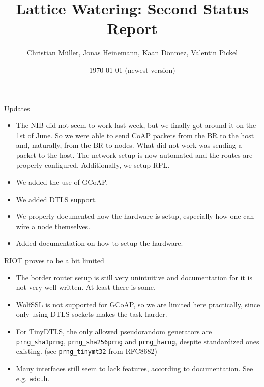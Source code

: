 \documentclass[10pt, xcolor=svgnames]{beamer}
\title{Lattice Watering: Second Status Report}
\author{Christian Müller, Jonas Heinemann, Kaan Dönmez, Valentin Pickel}
\institute{
    Software Project on Internet Communication

    Summer Term 2022
    
    Freie Universität Berlin

    Institute for Computer Science
}
\date{\today{ }(newest version)}
\begin{document}
\maketitle

\begin{frame}{Updates}
    \begin{itemize}
        \item The NIB did not seem to work last week, but we finally got around it on the 1st of June. So we were able to send CoAP packets from the BR to the host and, naturally, from the BR to nodes. What did not work was sending a packet to the host. The network setup is now automated and the routes are properly configured. Additionally, we setup RPL.
        \item We added the use of GCoAP.
        \item We added DTLS support.
        \item We properly documented how the hardware is setup, especially how one can wire a node themselves.
        \item Added documentation on how to setup the hardware.
    \end{itemize}
\end{frame}

\begin{frame}{RIOT proves to be a bit limited}
    \begin{itemize}
        \item The border router setup is still very unintuitive and documentation for it is not very well written. At least there is some.
        \item WolfSSL is not supported for GCoAP, so we are limited here practically, since only using DTLS sockets makes the task harder.
        \item For TinyDTLS, the only allowed pseudorandom generators are \texttt{prng\_sha1prng}, \texttt{prng\_sha256prng} and \texttt{prng\_hwrng}, despite standardized ones existing. (see \texttt{prng\_tinymt32} from RFC8682)
        \item Many interfaces still seem to lack features, according to documentation. See e.g. \texttt{adc.h}.
    \end{itemize}
\end{frame}
\end{document}
